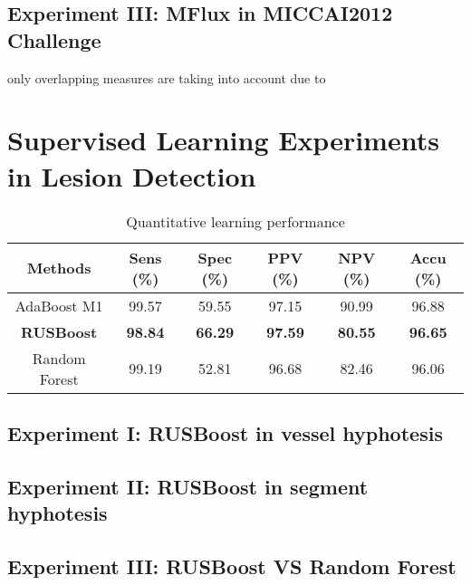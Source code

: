 \subsection{Experiment III: MFlux in MICCAI2012 Challenge}

only overlapping measures are taking into account due to 


\section{Supervised Learning Experiments in Lesion Detection}

\begin{table*}
\scriptsize
\caption{Quantitative learning performance}
\centering
\begin{tabular}{|c|c|c|c|c|c|}
\hline
\multicolumn{1}{|c|}{\textbf{Methods}} &\multicolumn{1}{c|}{\textbf{Sens (\%)}} &\multicolumn{1}{c|}{\textbf{Spec (\%)}} &\multicolumn{1}{c|}{\textbf{PPV (\%)}}&\multicolumn{1}{c|}{\textbf{NPV (\%)}}&\multicolumn{1}{c|}{\textbf{Accu (\%)}}\\
\hline
AdaBoost M1&99.57 &59.55 &97.15 &90.99 &96.88 \\
\textbf{RUSBoost} &\textbf{98.84} &\textbf{66.29} &\textbf{97.59} &\textbf{80.55} &\textbf{96.65}\\
Random Forest&99.19 &52.81 &96.68 &82.46 &96.06\\
\hline
\end{tabular}
\vspace{-0.3cm}
\label{tb:tb_4_8}
\normalsize
\end{table*}


\subsection{Experiment I: RUSBoost in vessel hyphotesis}
\subsection{Experiment II: RUSBoost in segment hyphotesis}

\subsection{Experiment III: RUSBoost VS Random Forest}



